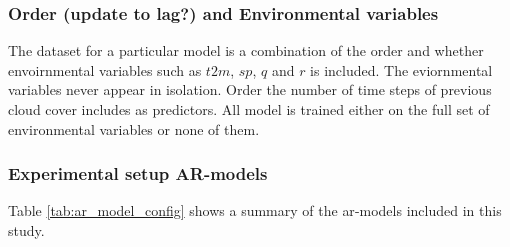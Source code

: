 \subsubsection{Order \textbf{(update to lag?)} and Environmental variables}
The dataset for a particular model is a combination of the order and whether envoirnmental variables such as $t2m$, $sp$, $q$ and $r$ is included. The eviornmental variables never appear in isolation.
Order the number of time steps of previous cloud cover includes as predictors.%
All model is trained either on the full set of environmental variables or none of them.

\subsubsection{Experimental setup AR-models}
Table \ref{tab:ar_model_config} shows a summary of the \acrshort{ar}-models included in this study. 

\begin{table}[h]
    \centering
    \caption{Configuration of \acrshort{ar}-models. $\times$ denoted not applied, \checked denotes applied \textbf{add bias??} Gi modellen navn basert på configurasjonen $AR_{STEx}$ where x is the order. \textbf{add column of number of parameters and score to avoid extra tables?}}
    \label{tab:ar_model_config}
\end{table}

